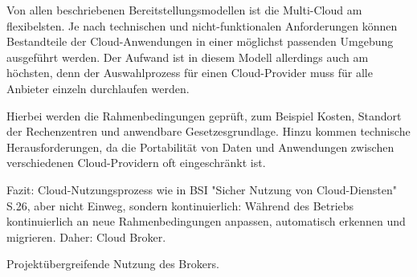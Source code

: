 \noindent
Von allen beschriebenen Bereitstellungsmodellen ist die Multi-Cloud am flexibelsten. Je nach technischen und nicht-funktionalen Anforderungen können Bestandteile der Cloud-Anwendungen in einer möglichst passenden Umgebung ausgeführt werden. Der Aufwand ist in diesem Modell allerdings auch am höchsten, denn der Auswahlprozess für einen Cloud-Provider muss für alle Anbieter einzeln durchlaufen werden.

Hierbei werden die Rahmenbedingungen geprüft, zum Beispiel Kosten, Standort der Rechenzentren und anwendbare Gesetzesgrundlage. Hinzu kommen technische Herausforderungen, da die Portabilität von Daten und Anwendungen zwischen verschiedenen Cloud-Providern oft eingeschränkt ist.

Fazit: Cloud-Nutzungsprozess wie in BSI "Sicher Nutzung von Cloud-Diensten" S.26, aber nicht Einweg, sondern kontinuierlich: Während des Betriebs kontinuierlich an neue Rahmenbedingungen anpassen, automatisch erkennen und migrieren. Daher: Cloud Broker.

Projektübergreifende Nutzung des Brokers. 




% 
%
%
%
%
%
%
%
%
%
